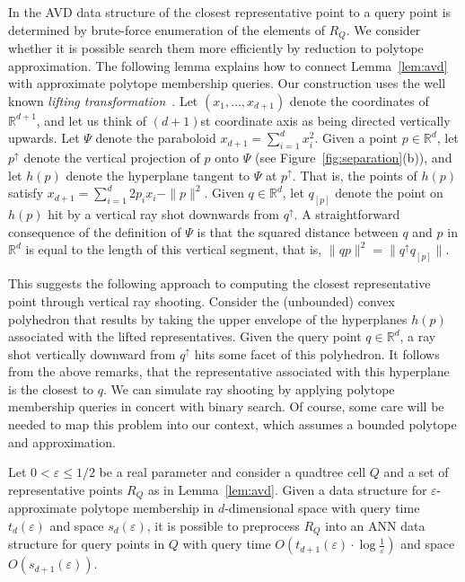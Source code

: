 \documentclass[11pt]{article}   \usepackage[letterpaper,hmargin=2.1cm,vmargin=3cm]{geometry}
\newcommand{\RE}{\mathbb{R}}    \newcommand{\ZZ}{\mathbb{Z}}    \newcommand{\eps}{\varepsilon}  \newcommand{\ST}{\,:\,}         \newcommand{\sq}{\square}
\newcommand{\inv}[1]{\frac{1}{#1}}
\begin{document}
In the AVD data structure of \cite{AVD-JACM} the closest representative point to a query point is determined by brute-force enumeration of the elements of $R_Q$. We consider whether it is possible search them more efficiently by reduction to polytope approximation. The following lemma explains how to connect Lemma~\ref{lem:avd} with approximate polytope membership queries. Our construction uses the well known \emph{lifting transformation}~\cite{ray-shooting-NN,edels}. Let $(x_1, \ldots, x_{d+1})$ denote the coordinates of $\RE^{d+1}$, and let us think of $(d+1)$st coordinate axis as being directed vertically upwards. Let $\Psi$ denote the paraboloid $x_{d+1} = \sum_{i=1}^d x_i^2$. Given a point $p \in \RE^d$, let $p^{\uparrow}$ denote the vertical projection of $p$ onto $\Psi$ (see Figure~\ref{fig:separation}(b)), and let $h(p)$ denote the hyperplane tangent to $\Psi$ at $p^{\uparrow}$. That is, the points of $h(p)$ satisfy $x_{d+1} = \sum_{i=1}^d 2 p_i x_i - \|p\|^2$. Given $q \in \RE^d$, let $q_{[p]}$ denote the point on $h(p)$ hit by a vertical ray shot downwards from $q^{\uparrow}$. A straightforward consequence of the definition of $\Psi$ is that the squared distance between $q$ and $p$ in $\RE^d$ is equal to the length of this vertical segment, that is, $\|q p\|^2 = \|q^{\uparrow} q_{[p]}\|$. 

This suggests the following approach to computing the closest representative point through vertical ray shooting. Consider the (unbounded) convex polyhedron that results by taking the upper envelope of the hyperplanes $h(p)$ associated with the lifted representatives. Given the query point $q \in \RE^d$, a ray shot vertically downward from $q^{\uparrow}$ hits some facet of this polyhedron. It follows from the above remarks, that the representative associated with this hyperplane is the closest to $q$. We can simulate ray shooting by applying polytope membership queries in concert with binary search. Of course, some care will be needed to map this problem into our context, which assumes a bounded polytope and approximation.

\begin{lemma} \label{lem:mini-reduction}
Let $0 < \eps \leq 1/2$ be a real parameter and consider a quadtree cell $Q$ and a set of representative points $R_Q$ as in Lemma~\ref{lem:avd}. Given a data structure for $\eps$-approximate polytope membership in $d$-dimensional space with query time $t_{d}(\eps)$ and space $s_{d}(\eps)$, it is possible to preprocess $R_Q$ into an ANN data structure for query points in $Q$ with query time $O(t_{d+1}(\eps) \cdot \log \inv{\eps})$ and space $O(s_{d+1}(\eps))$.
\end{lemma}
\end{document}
